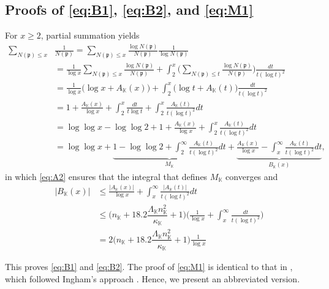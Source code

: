 \documentclass[10pt,reqno]{amsart}
\theoremstyle{plain}
\theoremstyle{definition}
\newcommand{\K}{\mathbb{K}}
\newcommand{\PP}{\mathfrak{p}}
\begin{document}
\subsection{Proofs of \eqref{eq:B1}, \eqref{eq:B2}, and \eqref{eq:M1}}\label{Section:Proof:B}
For $x \geq 2$, partial summation yields
\begin{align*}
    \sum_{N(\PP)\leq x}&\frac{1}{N(\PP)}
    = \sum_{N(\PP)\leq x}\frac{\log{N(\PP)}}{N(\PP)}\frac{1}{\log{N(\PP)}}\\
    &= \frac{1}{\log{x}} \sum_{N(\PP)\leq x}\frac{\log{N(\PP)}}{N(\PP)} + \int_2^x \bigg(\sum_{N(\PP)\leq t}\frac{\log{N(\PP)}}{N(\PP)}\bigg)\frac{dt}{t(\log t)^2}\\
    &= \frac{1}{\log{x}} \big(\log{x} + A_{\K}(x)\big) + \int_2^x \big(\log{t} + A_{\K}(t)\big)\frac{dt}{t(\log t)^2}\\
    &= 1 + \frac{A_{\K}(x)}{\log{x}} + \int_2^x \frac{dt}{t\log t} + \int_2^x \frac{A_{\K}(t)}{t(\log t)^2}dt\\
    &= \log\log{x} - \log\log{2}  + 1 + \frac{A_{\K}(x)}{\log{x}} + \int_2^x \frac{A_{\K}(t)}{t(\log t)^2}dt\\
    &= \log\log{x} + \underbrace{1- \log\log{2}  + \int_2^\infty \frac{A_{\K}(t)}{t(\log t)^2}dt}_{M_{\K}} 
    +  \underbrace{ \frac{A_{\K}(x)}{\log{x}} - \int_x^\infty \frac{A_{\K}(t)}{t(\log t)^2}dt }_{B_{\K}(x)},
\end{align*}
in which \eqref{eq:A2} ensures that the integral that defines $M_{\K}$ converges and
\begin{align*}
    |B_{\K}(x)|
    &\leq \frac{|A_{\K}(x)|}{\log{x}} + \int_x^\infty \frac{|A_{\K}(t)|}{t(\log t)^2}dt\\
    &\leq  \bigg(  n_{\K}  + 18.2 \dfrac{\Lambda_{\K}n_{\K}^2}{\kappa_{\K}} + 1  \bigg)
     \bigg( \frac{1}{\log x} + \int_x^\infty \frac{dt}{t(\log t)^2}\bigg)\\
    &= 2 \bigg(  n_{\K}  + 18.2 \dfrac{\Lambda_{\K}n_{\K}^2}{\kappa_{\K}} + 1  \bigg) \frac{1}{\log x}
\end{align*}

This proves \eqref{eq:B1} and \eqref{eq:B2}.
The proof of \eqref{eq:M1} is identical to that in \cite{EMT4NF1}, which followed
Ingham's approach \cite{Ingham}. Hence, we present an abbreviated version.
\end{document}
